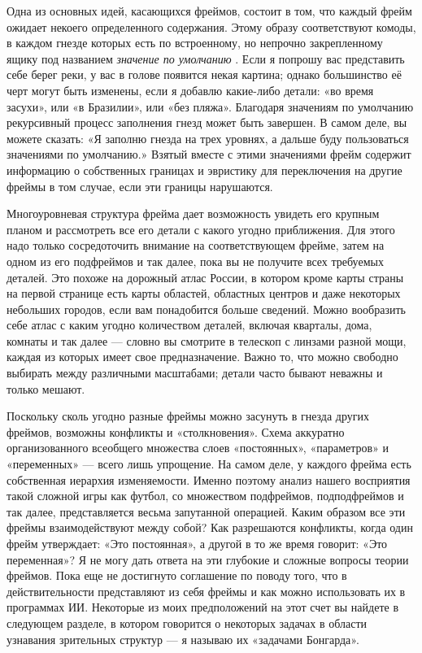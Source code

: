 \documentclass[../main.tex]{subfiles}
\begin{document}
Одна из основных идей, касающихся фреймов, состоит в том, что каждый фрейм ожидает некоего определенного содержания. Этому образу соответствуют комоды, в каждом гнезде которых есть по встроенному, но непрочно закрепленному ящику под названием \emph{значение по умолчанию} . Если я попрошу вас представить себе берег реки, у вас в голове появится некая картина; однако большинство её черт могут быть изменены, если я добавлю какие-либо детали: «во время засухи», или «в Бразилии», или «без пляжа». Благодаря значениям по умолчанию рекурсивный процесс заполнения гнезд может быть завершен. В самом деле, вы можете сказать: «Я заполню гнезда на трех уровнях, а дальше буду пользоваться значениями по умолчанию.» Взятый вместе с этими значениями фрейм содержит информацию о собственных границах и эвристику для переключения на другие фреймы в том случае, если эти границы нарушаются.

Многоуровневая структура фрейма дает возможность увидеть его крупным планом и рассмотреть все его детали с какого угодно приближения. Для этого надо только сосредоточить внимание на соответствующем фрейме, затем на одном из его подфреймов и так далее, пока вы не получите всех требуемых деталей. Это похоже на дорожный атлас России, в котором кроме карты страны на первой странице есть карты областей, областных центров и даже некоторых небольших городов, если вам понадобится больше сведений. Можно вообразить себе атлас с каким угодно количеством деталей, включая кварталы, дома, комнаты и так далее --- словно вы смотрите в телескоп с линзами разной мощи, каждая из которых имеет свое предназначение. Важно то, что можно свободно выбирать между различными масштабами; детали часто бывают неважны и только мешают.

Поскольку сколь угодно разные фреймы можно засунуть в гнезда других фреймов, возможны конфликты и «столкновения». Схема аккуратно организованного всеобщего множества слоев «постоянных», «параметров» и «переменных» --- всего лишь упрощение. На самом деле, у каждого фрейма есть собственная иерархия изменяемости. Именно поэтому анализ нашего восприятия такой сложной игры как футбол, со множеством подфреймов, подподфреймов и так далее, представляется весьма запутанной операцией. Каким образом все эти фреймы взаимодействуют между собой? Как разрешаются конфликты, когда один фрейм утверждает: «Это постоянная», а другой в то же время говорит: «Это переменная»? Я не могу дать ответа на эти глубокие и сложные вопросы теории фреймов. Пока еще не достигнуто соглашение по поводу того, что в действительности представляют из себя фреймы и как можно использовать их в программах ИИ. Некоторые из моих предположений на этот счет вы найдете в следующем разделе, в котором говорится о некоторых задачах в области узнавания зрительных структур --- я называю их «задачами Бонгарда».
\end{document}
